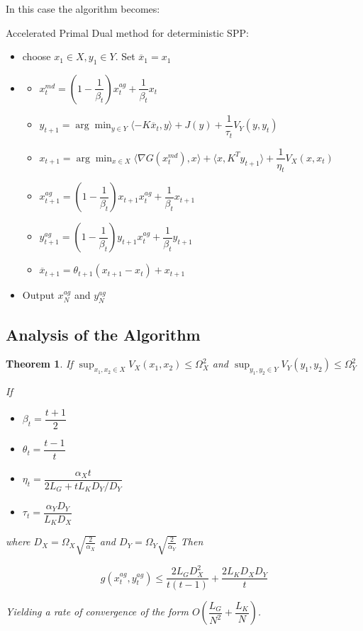 \documentclass[12pt,reqno]{amsart}
\newtheorem{thm}{Theorem}[section]
\numberwithin{equation}{section}
\begin{document}
In this case the algorithm becomes:

Accelerated Primal Dual method for deterministic SPP:
\begin{itemize}
\item choose $x_{1} \in X, y_{1} \in Y$. Set $\overline{x}_{1} = x_{1}$
\item

\begin{itemize}
\item $x_{t}^{md} = (1 - \dfrac{1}{\beta_{t}})x_{t}^{ag} +  \dfrac{1}{\beta_{t}}x_{t}$
\item $y_{t+1} = \arg\min_{y \in Y} \langle -K\overline{x}_{t},y\rangle + J(y) + \dfrac{1}{\tau_{t}}V_{Y}(y,y_{t})$
\item $x_{t+1} = \arg\min_{x \in X} \langle \nabla G(x_{t}^{md}) ,x \rangle + \langle x,K^{T}y_{t+1} \rangle + \dfrac{1}{\eta_{t}}V_{X}(x,x_{t})$
\item $x_{t+1}^{ag} = (1 -  \dfrac{1}{\beta_{t}})x_{t+1}x_{t}^{ag}+ \dfrac{1}{\beta_{t}}x_{t+1}$
\item $y_{t+1}^{ag} = (1 -  \dfrac{1}{\beta_{t}})y_{t+1}x_{t}^{ag}+ \dfrac{1}{\beta_{t}}y_{t+1}$
\item $\overline{x}_{t+1} = \theta_{t+1}(x_{t+1} - x_{t}) + x_{t+1}$
\end{itemize}

\item Output $x_{N}^{ag}$ and $y_{N}^{ag}$
\end{itemize}

\subsection{Analysis of the Algorithm}

\begin{thm}

If $\sup_{x_{1},x_{2} \in X} V_{X}(x_{1},x_{2}) \leq \Omega_{X}^{2}$ and 
$\sup_{y_{1},y_{2} \in Y} V_{Y}(y_{1},y_{2}) \leq \Omega_{Y}^{2}$

If \begin{itemize}
\item $\beta_{t} = \dfrac{t+1}{2}$
\item $\theta_{t} = \dfrac{t-1}{t}$
\item $\eta_{t} = \dfrac{\alpha_{X}t}{2L_{G} + tL_{K}D_{Y}/D_{Y}}$
\item $\tau_{t} = \dfrac{\alpha_{Y}D_{Y}}{L_{K}D_{X}}$
\end{itemize}
where $D_{X} = \Omega_{X}\sqrt{\frac{2}{\alpha_{X}}}$ and $D_{Y} = \Omega_{Y}\sqrt{\frac{2}{\alpha_{Y}}}$
Then

$$
g(x_{t}^{ag},y_{t}^{ag}) \leq \dfrac{2L_{G}D_{X}^{2}}{t(t-1)} + \dfrac{2L_{K}D_{X}D_{Y}}{t}
$$

Yielding a rate of convergence of the form $O(\dfrac{L_{G}}{N^{2}} + \dfrac{L_{K}}{N})$.

\end{thm}
\end{document}

